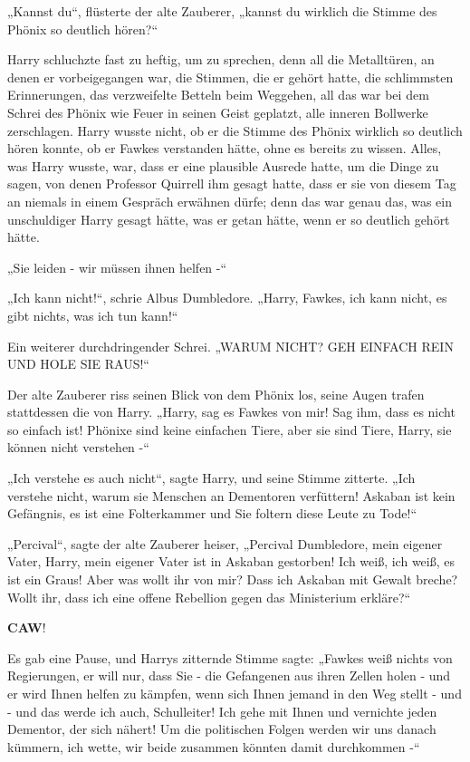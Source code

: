 {„Kannst du“, flüsterte der alte Zauberer, „kannst du wirklich die Stimme des Phönix so deutlich hören?“

Harry schluchzte fast zu heftig, um zu sprechen, denn all die Metalltüren, an denen er vorbeigegangen war, die Stimmen, die er gehört hatte, die schlimmsten Erinnerungen, das verzweifelte Betteln beim Weggehen, all das war bei dem Schrei des Phönix wie Feuer in seinen Geist geplatzt, alle inneren Bollwerke zerschlagen. Harry wusste nicht, ob er die Stimme des Phönix wirklich so deutlich hören konnte, ob er Fawkes verstanden hätte, ohne es bereits zu wissen. Alles, was Harry wusste, war, dass er eine plausible Ausrede hatte, um die Dinge zu sagen, von denen Professor Quirrell ihm gesagt hatte, dass er sie von diesem Tag an niemals in einem Gespräch erwähnen dürfe; denn das war genau das, was ein unschuldiger Harry gesagt hätte, was er getan hätte, wenn er so deutlich gehört hätte.

„Sie leiden - wir müssen ihnen helfen -“

„Ich kann nicht!“, schrie Albus Dumbledore. „Harry, Fawkes, ich kann nicht, es gibt nichts, was ich tun kann!“

Ein weiterer durchdringender Schrei. „WARUM NICHT? GEH EINFACH REIN UND HOLE SIE RAUS!“

Der alte Zauberer riss seinen Blick von dem Phönix los, seine Augen trafen stattdessen die von Harry. „Harry, sag es Fawkes von mir! Sag ihm, dass es nicht so einfach ist! Phönixe sind keine einfachen Tiere, aber sie sind Tiere, Harry, sie können nicht verstehen -“

„Ich verstehe es auch nicht“, sagte Harry, und seine Stimme zitterte. „Ich verstehe nicht, warum sie Menschen an Dementoren verfüttern! Askaban ist kein Gefängnis, es ist eine Folterkammer und Sie foltern diese Leute zu Tode!“

„Percival“, sagte der alte Zauberer heiser, „Percival Dumbledore, mein eigener Vater, Harry, mein eigener Vater ist in Askaban gestorben! Ich weiß, ich weiß, es ist ein Graus! Aber was wollt ihr von mir? Dass ich Askaban mit Gewalt breche? Wollt ihr, dass ich eine offene Rebellion gegen das Ministerium erkläre?“

\textbf{CAW}!

Es gab eine Pause, und Harrys zitternde Stimme sagte: „Fawkes weiß nichts von Regierungen, er will nur, dass Sie - die Gefangenen aus ihren Zellen holen - und er wird Ihnen helfen zu kämpfen, wenn sich Ihnen jemand in den Weg stellt - und - und das werde ich auch, Schulleiter! Ich gehe mit Ihnen und vernichte jeden Dementor, der sich nähert! Um die politischen Folgen werden wir uns danach kümmern, ich wette, wir beide zusammen könnten damit durchkommen -“

}
